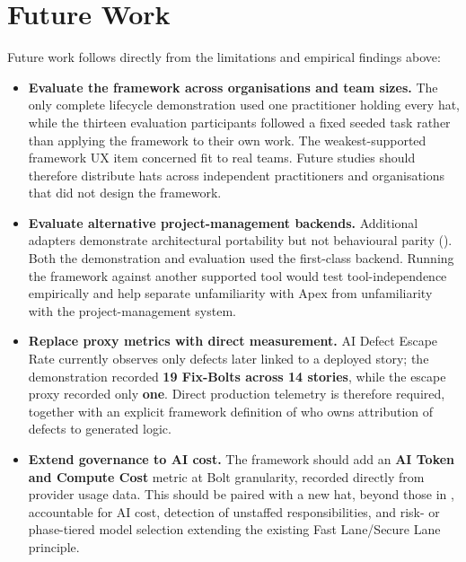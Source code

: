 \section{Future Work}
\label{sec:future_work}

Future work follows directly from the limitations and empirical findings above:

\begin{itemize}[leftmargin=0.6cm, itemsep=0.4em]

\item \textbf{Evaluate the framework across organisations and team sizes.} The only complete lifecycle demonstration used one practitioner holding every hat, while the thirteen evaluation participants followed a fixed seeded task rather than applying the framework to their own work. The weakest-supported framework \ac{UX} item concerned fit to real teams. Future studies should therefore distribute hats across independent practitioners and organisations that did not design the framework.

\item \textbf{Evaluate alternative project-management backends.} Additional adapters demonstrate architectural portability but not behavioural parity (). Both the demonstration and evaluation used the first-class backend. Running the framework against another supported tool would test tool-independence empirically and help separate unfamiliarity with Apex from unfamiliarity with the project-management system.

\item \textbf{Replace proxy metrics with direct measurement.} AI Defect Escape Rate currently observes only defects later linked to a deployed story; the demonstration recorded \textbf{19 Fix-Bolts across 14 stories}, while the escape proxy recorded only \textbf{one}. Direct production telemetry is therefore required, together with an explicit framework definition of who owns attribution of defects to generated logic.

\item \textbf{Extend governance to AI cost.} The framework should add an \textbf{AI Token and Compute Cost} metric at Bolt granularity, recorded directly from provider usage data. This should be paired with a new hat, beyond those in , accountable for AI cost, detection of unstaffed responsibilities, and risk- or phase-tiered model selection extending the existing Fast Lane/Secure Lane principle.


\end{itemize}
